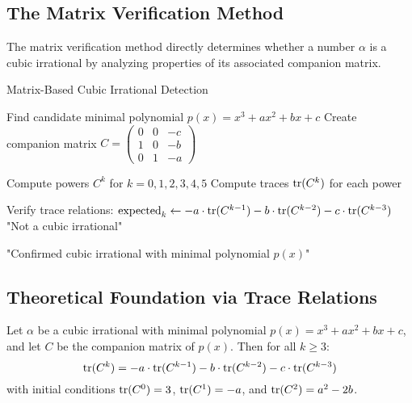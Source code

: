 \subsection{The Matrix Verification Method}

The matrix verification method directly determines whether a number $\alpha$ is a cubic irrational by analyzing properties of its associated companion matrix.

\begin{algorithm}
\caption{Matrix-Based Cubic Irrational Detection}
\label{alg:matrix_verification}
\begin{algorithmic}[1]
    \State Find candidate minimal polynomial $p(x) = x^3 + ax^2 + bx + c$
    \State Create companion matrix $C = \begin{pmatrix} 0 & 0 & -c \\ 1 & 0 & -b \\ 0 & 1 & -a \end{pmatrix}$
    
    \State Compute powers $C^k$ for $k = 0, 1, 2, 3, 4, 5$
    \State Compute traces $\operatorname{tr}(C^k)$ for each power
    
    \State Verify trace relations:
        \State $\text{expected}_k \gets -a \cdot \operatorname{tr}(C^{k-1}) - b \cdot \operatorname{tr}(C^{k-2}) - c \cdot \operatorname{tr}(C^{k-3})$ %
            \State \Return "Not a cubic irrational"
        \EndIf
    \EndFor
    
    \State \Return "Confirmed cubic irrational with minimal polynomial $p(x)$"
\EndProcedure
\end{algorithmic}
\end{algorithm}

\subsection{Theoretical Foundation via Trace Relations}

\begin{theorem}\label{thm:trace_relations}
Let $\alpha$ be a cubic irrational with minimal polynomial $p(x) = x^3 + ax^2 + bx + c$, and let $C$ be the companion matrix of $p(x)$. Then for all $k \geq 3$:
\begin{equation}
\operatorname{tr}(C^k) = -a \cdot \operatorname{tr}(C^{k-1}) - b \cdot \operatorname{tr}(C^{k-2}) - c \cdot \operatorname{tr}(C^{k-3})
\end{equation}
with initial conditions $\operatorname{tr}(C^0) = 3$, $\operatorname{tr}(C^1) = -a$, and $\operatorname{tr}(C^2) = a^2-2b$. %
\end{theorem}


